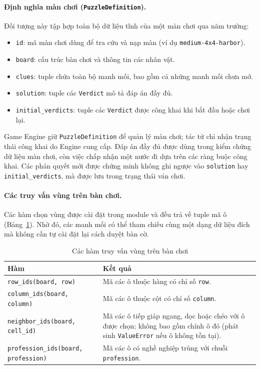 \begin{sloppypar}
\paragraph{Định nghĩa màn chơi (\texttt{PuzzleDefinition}).}
Đối tượng này tập hợp toàn bộ dữ liệu tĩnh của một màn chơi qua năm trường:
\begin{itemize}
    \item \texttt{id}: mã màn chơi dùng để tra cứu và nạp màn (ví dụ \texttt{medium-4x4-harbor}).
    \item \texttt{board}: cấu trúc bàn chơi và thông tin các nhân vật.
    \item \texttt{clues}: tuple chứa toàn bộ manh mối, bao gồm cả những manh mối chưa mở.
    \item \texttt{solution}: tuple các \texttt{Verdict} mô tả đáp án đầy đủ.
    \item \texttt{initial\_verdicts}: tuple các \texttt{Verdict} được công khai khi bắt đầu hoặc chơi lại.
\end{itemize}
Game Engine giữ \texttt{PuzzleDefinition} để quản lý màn chơi; tác tử chỉ nhận trạng thái công khai do Engine cung cấp. Đáp án đầy đủ được dùng trong kiểm chứng dữ liệu màn chơi, còn việc chấp nhận một nước đi dựa trên các ràng buộc công khai. Các phán quyết mới được chứng minh không ghi ngược vào \texttt{solution} hay \texttt{initial\_verdicts}, mà được lưu trong trạng thái ván chơi.

\paragraph{Các truy vấn vùng trên bàn chơi.}
Các hàm chọn vùng được cài đặt trong module  và đều trả về tuple mã ô (Bảng~\ref{tab:board_region_queries}). Nhờ đó, các manh mối có thể tham chiếu cùng một dạng dữ liệu đích mà không cần tự cài đặt lại cách duyệt bàn cờ.

\begin{table}[htbp]
    \centering
    \caption{Các hàm truy vấn vùng trên bàn chơi}
    \label{tab:board_region_queries}
    \renewcommand{\arraystretch}{1.2}
    \begin{tabularx}{\textwidth}{l>{\raggedright\arraybackslash}X}
        \toprule
        \textbf{Hàm} & \textbf{Kết quả} \\
        \midrule
        \texttt{row\_ids(board, row)} & Mã các ô thuộc hàng có chỉ số \texttt{row}. \\
        \texttt{column\_ids(board, column)} & Mã các ô thuộc cột có chỉ số \texttt{column}. \\
        \texttt{neighbor\_ids(board, cell\_id)} & Mã các ô tiếp giáp ngang, dọc hoặc chéo với ô được chọn; không bao gồm chính ô đó (phát sinh \texttt{ValueError} nếu ô không tồn tại). \\
        \texttt{profession\_ids(board, profession)} & Mã các ô có nghề nghiệp trùng với chuỗi \texttt{profession}. \\
        \bottomrule
    \end{tabularx}
\end{table}


\end{sloppypar}
